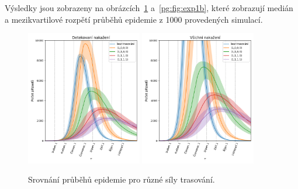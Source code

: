 Výsledky jsou zobrazeny na obrázcích~\ref{pg:fig:exp1a}
a~\ref{pg:fig:exp1b}, které zobrazují medián a mezikvartilové rozpětí
průběhů epidemie z 1000 provedených simulací.



\begin{figure}[ht!]
  \centering
  \includegraphics[width=0.45\textwidth]{pic/history_second_exp_detected_iqr.png}
  \includegraphics[width=0.45\textwidth]{pic/history_second_exp_all_iqr.png}
  \caption{Srovnání průběhů epidemie pro různé síly trasování.}
  \label{pg:fig:exp1a}
\end{figure}

